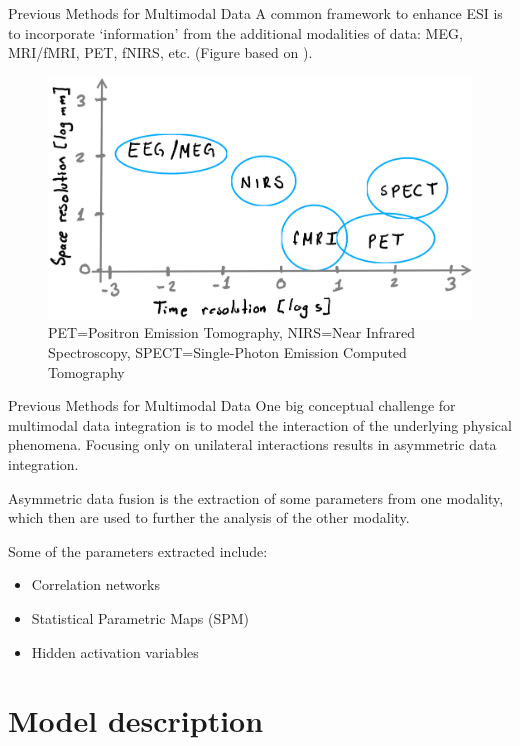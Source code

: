 \documentclass[progressbar=head]{beamer}
\begin{document}
\begin{frame}{Previous Methods for Multimodal Data}
A common framework
to enhance ESI is to incorporate 
`information' from the additional \alert{modalities} of data:
MEG, MRI/fMRI\cite{he2008multimodal, huster2012methods}, PET, fNIRS\cite{fnirs}, etc.
(Figure based on \cite{he2008multimodal}).

\begin{figure}
\centering
\includegraphics[width=0.65\linewidth]{./img_oldbeamer/sketch07}
\caption{PET=Positron Emission Tomography, NIRS=Near Infrared Spectroscopy, SPECT=Single-Photon Emission Computed Tomography}
\end{figure}
\end{frame}

\begin{frame}{Previous Methods for Multimodal Data}
One big conceptual challenge for multimodal data integration is to model the interaction of the underlying physical phenomena. 
%
Focusing only on unilateral interactions results in asymmetric data integration.

\alert{Asymmetric data fusion} is the extraction of some parameters from one modality, which then are used to further the analysis of the other modality.

Some of the parameters extracted include:
\begin{itemize}
    \item Correlation networks
    \item Statistical Parametric Maps (SPM)
    \item Hidden activation variables \cite{fire}
\end{itemize}

\end{frame}

{
\section[Model]{Model description}
}
\end{document}

